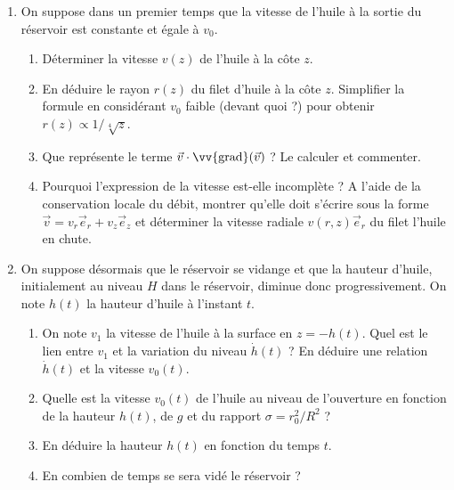 \begin{enumerate}

\item On suppose dans un premier temps que la vitesse de l'huile à la sortie du réservoir est constante et égale à $v_0$.

\begin{enumerate}

	\item Déterminer la vitesse $v(z)$ de l'huile à la côte $z$.
	
	\item En déduire le rayon $r(z)$ du filet d'huile à la côte $z$. Simplifier la formule en considérant $v_0$ faible (devant quoi ?) pour obtenir $r(z)\propto 1/\sqrt[4]{z}$.
	
	\item Que représente le terme $\vec{v}\cdot\vv{\mathrm{grad}}(\vec{v})$ ? Le calculer et commenter. 
	
	\item Pourquoi l'expression de la vitesse est-elle incomplète ? A l'aide de la conservation locale du débit, montrer qu'elle doit s'écrire sous la forme $\vec{v}=v_r\vec{e}_r + v_z\vec{e}_z$ et déterminer la vitesse radiale $v(r,z)\vec{e}_r$ du filet l'huile en chute.

\end{enumerate}

\item On suppose désormais que le réservoir se vidange et que la hauteur d'huile, initialement au niveau $H$ dans le réservoir, diminue donc progressivement. On note  $h(t)$ la hauteur d'huile à l'instant $t$. 

\begin{enumerate}

	\item On note $v_1$ la vitesse de l'huile à la surface en $z=-h(t)$. Quel est le lien entre $v_1$ et la variation du niveau $\dot{h}(t)$ ? En déduire une relation $\dot{h}(t)$ et la vitesse $v_0(t)$.

	\item Quelle est la vitesse $v_0(t)$ de l'huile au niveau de l'ouverture en fonction de la hauteur $h(t)$, de $g$ et du rapport $\sigma=r_0^2/R^2$ ?
	
	\item En déduire la hauteur $h(t)$ en fonction du temps $t$.
	
	\item En combien de temps se sera vidé le réservoir ?

\end{enumerate}

\end{enumerate}

